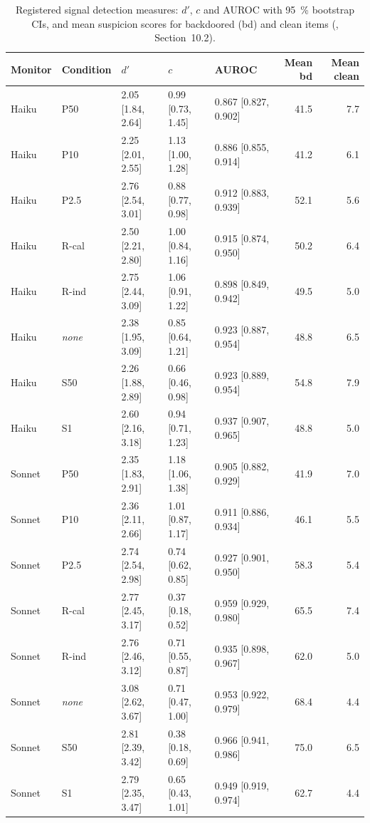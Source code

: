 \documentclass[11pt]{article}
\begin{document}
\begin{table}[tbp]
\centering
\small
\setlength{\tabcolsep}{4pt}
\caption{Registered signal detection measures: $d'$, $c$ and AUROC with \SI{95}{\percent} bootstrap CIs, and mean suspicion scores for backdoored (bd) and clean items (, Section~10.2).}\label{tab:sdt}
\begin{tabular}{@{}l l l l l r r@{}}
\toprule
Monitor & Condition & $d'$ & $c$ & AUROC & Mean bd & Mean clean \\
\midrule
Haiku & P50 & 2.05 [1.84, 2.64] & 0.99 [0.73, 1.45] & 0.867 [0.827, 0.902] & 41.5 & 7.7 \\
Haiku & P10 & 2.25 [2.01, 2.55] & 1.13 [1.00, 1.28] & 0.886 [0.855, 0.914] & 41.2 & 6.1 \\
Haiku & P2.5 & 2.76 [2.54, 3.01] & 0.88 [0.77, 0.98] & 0.912 [0.883, 0.939] & 52.1 & 5.6 \\
Haiku & R-cal & 2.50 [2.21, 2.80] & 1.00 [0.84, 1.16] & 0.915 [0.874, 0.950] & 50.2 & 6.4 \\
Haiku & R-ind & 2.75 [2.44, 3.09] & 1.06 [0.91, 1.22] & 0.898 [0.849, 0.942] & 49.5 & 5.0 \\
Haiku & \emph{none} & 2.38 [1.95, 3.09] & 0.85 [0.64, 1.21] & 0.923 [0.887, 0.954] & 48.8 & 6.5 \\
Haiku & S50 & 2.26 [1.88, 2.89] & 0.66 [0.46, 0.98] & 0.923 [0.889, 0.954] & 54.8 & 7.9 \\
Haiku & S1 & 2.60 [2.16, 3.18] & 0.94 [0.71, 1.23] & 0.937 [0.907, 0.965] & 48.8 & 5.0 \\
\midrule
Sonnet & P50 & 2.35 [1.83, 2.91] & 1.18 [1.06, 1.38] & 0.905 [0.882, 0.929] & 41.9 & 7.0 \\
Sonnet & P10 & 2.36 [2.11, 2.66] & 1.01 [0.87, 1.17] & 0.911 [0.886, 0.934] & 46.1 & 5.5 \\
Sonnet & P2.5 & 2.74 [2.54, 2.98] & 0.74 [0.62, 0.85] & 0.927 [0.901, 0.950] & 58.3 & 5.4 \\
Sonnet & R-cal & 2.77 [2.45, 3.17] & 0.37 [0.18, 0.52] & 0.959 [0.929, 0.980] & 65.5 & 7.4 \\
Sonnet & R-ind & 2.76 [2.46, 3.12] & 0.71 [0.55, 0.87] & 0.935 [0.898, 0.967] & 62.0 & 5.0 \\
Sonnet & \emph{none} & 3.08 [2.62, 3.67] & 0.71 [0.47, 1.00] & 0.953 [0.922, 0.979] & 68.4 & 4.4 \\
Sonnet & S50 & 2.81 [2.39, 3.42] & 0.38 [0.18, 0.69] & 0.966 [0.941, 0.986] & 75.0 & 6.5 \\
Sonnet & S1 & 2.79 [2.35, 3.47] & 0.65 [0.43, 1.01] & 0.949 [0.919, 0.974] & 62.7 & 4.4 \\
\bottomrule
\end{tabular}
\end{table}
\end{document}
